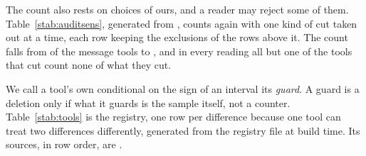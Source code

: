 \documentclass[10pt,journal,onecolumn]{IEEEtran}
\begin{document}
The count also rests on choices of ours, and a reader may reject some of them.
Table~\ref{stab:auditsens}, generated from ,
counts again with one kind of cut taken out at a time, each row keeping the exclusions of the rows
above it. The count falls from \harnessMessageCutAllWord{} of the
\harnessMessageWord{} message tools to \auditStrictWord{}, and in every reading all but one of the
tools that cut count none of what they cut.

\begin{table}[tb]
\caption{\textbf{Under the strictest reading, \auditStrictWord{} of the \harnessMessageWord{}
message tools still cut a value at or below zero.} Cut: the message tools that remove such a value
from a figure they report. Of them, uncounted: those that count none of what they remove. Each row
takes out one more kind of cut, keeping the exclusions of the rows above it.}
\label{stab:auditsens}
\centering
\footnotesize

\end{table}

We call a tool's own conditional on the sign of an interval its \emph{guard}. A guard is a deletion
only if what it guards is the sample itself, not a counter. Table~\ref{stab:tools} is the
registry, one row per difference because one tool can treat two differences differently, generated from the
registry file at build time. Its sources, in row order, are \registryTableSources.

\begin{table}[tb]
\caption{\textbf{Of the \harnessAuditedWord{} tools we read at source, \harnessSilentWord{} dispose
of a value at or below zero without counting it.} The difference each measures, the clock it reads, what
happens to a value at or below zero, and whether the tool counts what it discards; one row per
difference where a tool measures two, and a dash where nothing is discarded. Maintainer: the
organization or person that maintains the tool; \harnessOrganizationsWord{} of the
\harnessVendorsWord{} maintainers are organizations. The tools come in \harnessLanguagesWord{} languages.}
\label{stab:tools}
\centering
\footnotesize

\end{table}
\end{document}

